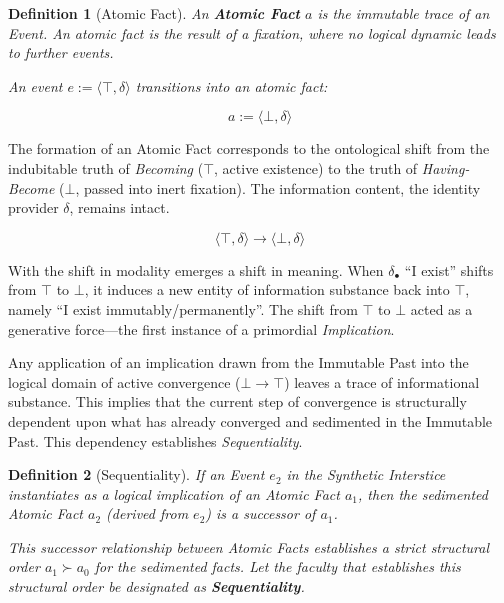 \documentclass[11pt, a4paper]{article}
\theoremstyle{formalism}
\newtheorem{formalism}{Definition}
\begin{document}
\begin{formalism}[Atomic Fact]

    An \textbf{Atomic Fact} $a$ is the immutable trace of an Event. An atomic
    fact is the result of a fixation, where no logical dynamic leads to further
    events.

    An event $e := \langle \top, \delta \rangle$ transitions into an atomic fact:

    \begin{equation}
        a := \langle \bot, \delta \rangle
    \end{equation}
\end{formalism}

The formation of an Atomic Fact corresponds to the ontological shift from
the indubitable truth of \textit{Becoming} ($\top$, active existence) to
the truth of \textit{Having-Become} ($\bot$, passed into inert fixation). The
information content, the identity provider $\delta$, remains intact.

\begin{equation}
    \langle \top, \delta \rangle \rightarrow \langle \bot, \delta \rangle
\end{equation}

With the shift in modality emerges a shift in meaning. When $\delta_\bullet$
``I exist'' shifts from $\top$ to $\bot$, it induces a new entity of
information substance back into $\top$, namely ``I exist immutably/permanently''.
The shift from $\top$ to $\bot$ acted as a generative force---the first
instance of a primordial \textit{Implication}.

Any application of an implication drawn from the Immutable Past into the
logical domain of active convergence ($\bot \rightarrow \top$) leaves a trace
of informational substance. This implies that the current step of convergence
is structurally dependent upon what has already converged and sedimented in the
Immutable Past. This dependency establishes \textit{Sequentiality}.

\begin{formalism}[Sequentiality]
    If an Event $e_2$ in the Synthetic Interstice instantiates as a logical 
    implication of an Atomic Fact $a_1$, then the sedimented Atomic Fact $a_2$ 
    (derived from $e_2$) is a successor of $a_1$.

    This successor relationship between Atomic Facts establishes a strict structural
    order $a_1 \succ a_0$ for the sedimented facts. Let the faculty that 
    establishes this structural order be designated as \textbf{Sequentiality}.
\end{formalism}
\end{document}
